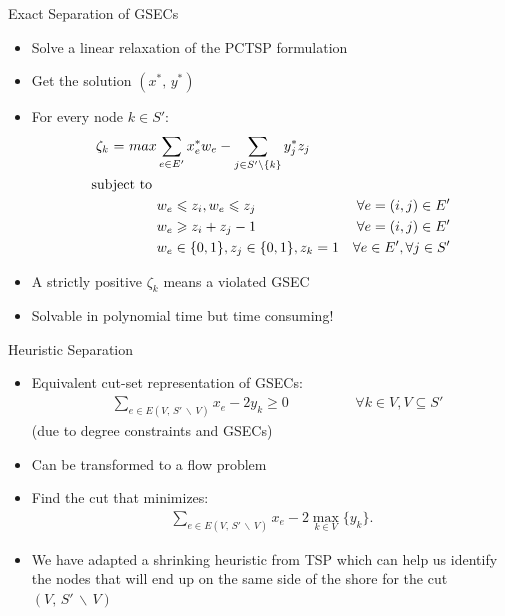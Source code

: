 \documentclass[10pt]{beamer}
\begin{document}
\begin{frame}[fragile]{Exact Separation of GSECs}
\begin{itemize}
    \item<1-> Solve a linear relaxation of the PCTSP formulation
    \item<2-> Get the solution $(x^*, \, y^*)$ 
    \item<3-> For every node $k \in S'$:
    \begin{align} 
        \zeta_k \ \text  = \ {max } \label{sep_obj} & \sum_{e\in E'} x_e^{*} w_e  - \sum_{j \in S' \backslash \{ k \}}  y_j^{*} z_j     &  \\
        \text{subject to }                          & & \nonumber \\
        \label{const:sep1}                          & w_e\leq z_i, w_e\leq z_j  & \forall e =(i,j) \in E' \\
        \label{const:sep2}                          & w_e \geq z_i + z_j - 1    & \forall e = (i,j) \in E' \\
        \label{const:sep3}                          & w_e \in \{0,1\}, z_j \in \{0,1\}, z_k = 1   & \forall e \in E', \forall j \in S'
    \end{align}
    \item<4-> A strictly positive $\zeta_k$ means a violated GSEC
    \item<5-> Solvable in polynomial time but \alert{time consuming!}
\end{itemize}
\end{frame}

\begin{frame}{Heuristic Separation}
\begin{itemize}
\item<1-> Equivalent cut-set representation of GSECs:
\begin{align}
\label{eq:cut-set}
& \sum_{ e \in E(V, \, S' \, \backslash \, V) } x_{e} - 2 y_{k} \geq 0   \hspace {2cm}   \forall k \in V, V \subseteq S'
\end{align}
(due to degree constraints and GSECs)
\item<2-> Can be transformed to a flow problem 
\item<3->  Find the cut that minimizes:
\begin{align}
\label{eq:min-cut}
\sum_{ e \in E(V, \, S' \, \backslash \, V) } x_{e} - 2 \max_{k \in V} \{ y_{k} \}.
\end{align}
\item<4-> We have adapted a shrinking heuristic from TSP which can help us identify the nodes that will end up on the same side of the \alert{shore} for the cut $(V, \, S' \, \backslash \, V)$
\end{itemize}
\end{frame}
\end{document}
